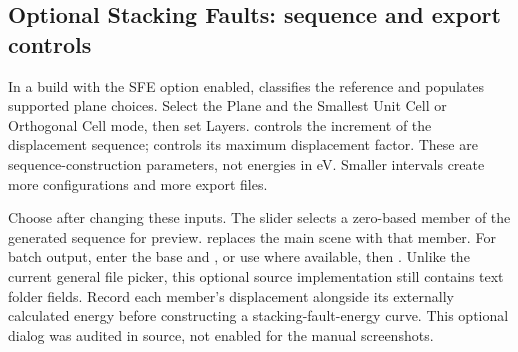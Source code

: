\subsection{Optional Stacking Faults: sequence and export controls}
In a build with the SFE option enabled,  classifies the reference and populates supported plane choices. Select the Plane and the Smallest Unit Cell or Orthogonal Cell mode, then set Layers.  controls the increment of the displacement sequence;  controls its maximum displacement factor. These are sequence-construction parameters, not energies in eV. Smaller intervals create more configurations and more export files.

Choose  after changing these inputs. The  slider selects a zero-based member of the generated sequence for preview.  replaces the main scene with that member. For batch output, enter the base  and , or use  where available, then . Unlike the current general file picker, this optional source implementation still contains text folder fields. Record each member's displacement alongside its externally calculated energy before constructing a stacking-fault-energy curve. This optional dialog was audited in source, not enabled for the manual screenshots.
